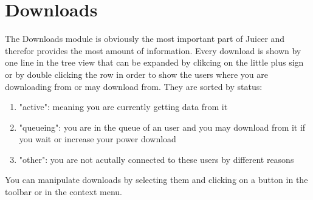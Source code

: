 \documentclass[a4paper,10pt]{book}
\begin{document}
\section{Downloads}
\label{sec:downloads}
The Downloads module is obviously the most important part of Juicer and therefor provides the most amount of information.
Every download is shown by one line in the tree view that can be expanded by clikcing on the little plus sign or by double clicking
the row in order to show the users where you are downloading from or may download from. They are sorted by status:
\begin{enumerate}
 \item "active": meaning you are currently getting data from it
 \item "queueing": you are in the queue of an user and you may download from it if you wait or increase your power download
 \item "other": you are not acutally connected to these users by different reasons
\end{enumerate}
You can manipulate downloads by selecting them and clicking on a button in the toolbar or in the context menu.
\end{document}
